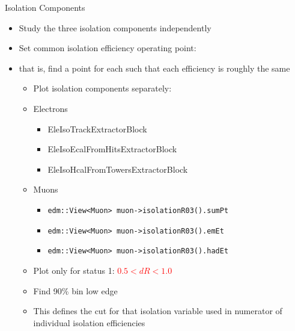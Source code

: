 \documentclass{beamer}
\begin{document}
\begin{frame}{Isolation Components}

  \begin{itemize}
  \item Study the three isolation components independently
  \item Set common isolation efficiency operating point: 
  \item that is, find a point for each such that each efficiency is roughly the same
    \begin{itemize}
    \item Plot isolation components separately:
      \item Electrons
        \begin{itemize}
        \item EleIsoTrackExtractorBlock
        \item EleIsoEcalFromHitsExtractorBlock
        \item EleIsoHcalFromTowersExtractorBlock
        \end{itemize}
      \item Muons
        \begin{itemize}
        \item \texttt{edm::View<Muon> muon->isolationR03().sumPt}
        \item \texttt{edm::View<Muon> muon->isolationR03().emEt}
        \item \texttt{edm::View<Muon> muon->isolationR03().hadEt}
        \end{itemize}
    \item Plot only for status 1: \textcolor{red}{$0.5 < dR < 1.0$}
    \item Find 90\% bin low edge
    \item This defines the cut for that isolation variable used in numerator of individual isolation efficiencies
    \end{itemize}
  \end{itemize}
  

\end{frame}
\end{document}
